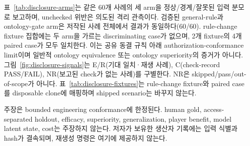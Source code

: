 표~\ref{tab:disclosure-arms}는 같은 60개 사례의 세 arm을 정상/경계/잘못된 입력 분모로 보고하며, unchecked 위반은 의도된 격리 관측이다. 검증된 general-rule과 ontology-gate arm은 저작된 사례 전체에서 결과가 동일하다(60/60). rule-change fixture 집합에는 두 arm을 가르는 discriminating case가 없으며, 2개 fixture의 4개 paired case가 모두 일치한다. 이는 공유 동결 규칙 아래 authorization-conformance limit이며 일반적 ontology equivalence 또는 ontology superiority의 증거가 아니다. 그림~\ref{fig:disclosure-signals}는 E/R(기대 일치·재생 사례), C(check-record PASS/FAIL), NR(보고된 check가 없는 사례)를 구별한다. NR은 skipped/pass/out-of-scope가 아니다. 표~\ref{tab:disclosure-fixtures}는 rule-change fixture와 paired case를 disposable clone에 매핑하며 shipped scenario는 바꾸지 않는다.

주장은 bounded engineering conformance에 한정된다. human gold, access-separated holdout, efficacy, superiority, generalization, player benefit, model latent state, cost는 주장하지 않는다. 저자가 보유한 생산자 기록에는 입력 식별과 hash가 결속되며, 재생성 명령은 여기에 제공하지 않는다.
